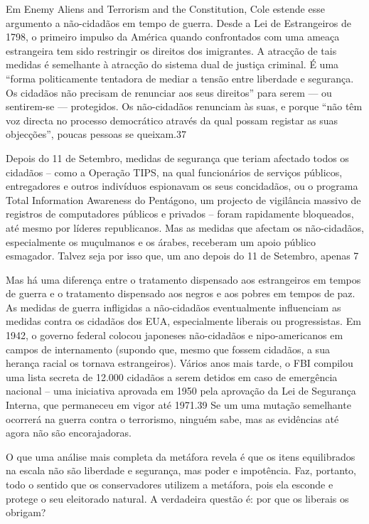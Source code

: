  \par 
Em Enemy Aliens and Terrorism and the Constitution, Cole estende esse argumento a não-cidadãos em tempo de guerra. Desde a Lei de Estrangeiros de 1798, o primeiro impulso da América quando confrontados com uma ameaça estrangeira tem sido restringir os direitos dos imigrantes. A atracção de tais medidas é semelhante à atracção do sistema dual de justiça criminal. É uma “forma politicamente tentadora de mediar a tensão entre liberdade e segurança. Os cidadãos não precisam de renunciar aos seus direitos” para serem — ou sentirem-se — protegidos. Os não-cidadãos renunciam às suas, e porque “não têm voz directa no processo democrático através da qual possam registar as suas objecções”, poucas pessoas se queixam.{\color{blue}37}
 \par 
Depois do {\color{blue}11} de Setembro, medidas de segurança que teriam afectado todos os cidadãos – como a Operação TIPS, na qual funcionários de serviços públicos, entregadores e outros indivíduos espionavam os seus concidadãos, ou o programa Total Information Awareness do Pentágono, um projecto de vigilância massivo de registros de computadores públicos e privados – foram rapidamente bloqueados, até mesmo por líderes republicanos. Mas as medidas que afectam os não-cidadãos, especialmente os muçulmanos e os árabes, receberam um apoio público esmagador. Talvez seja por isso que, um ano depois do {\color{blue}11} de Setembro, apenas 7%
 \par 
Mas há uma diferença entre o tratamento dispensado aos estrangeiros em tempos de guerra e o tratamento dispensado aos negros e aos pobres em tempos de paz. As medidas de guerra infligidas a não-cidadãos eventualmente influenciam as medidas contra os cidadãos dos EUA, especialmente liberais ou progressistas. Em 1942, o governo federal colocou japoneses não-cidadãos e nipo-americanos em campos de internamento (supondo que, mesmo que fossem cidadãos, a sua herança racial os tornava estrangeiros). Vários anos mais tarde, o FBI compilou uma lista secreta de {\color{blue}12}.{\color{blue}000} cidadãos a serem detidos em caso de emergência nacional – uma iniciativa aprovada em 1950 pela aprovação da Lei de Segurança Interna, que permaneceu em vigor até 1971.{\color{blue}39} Se um uma mutação semelhante ocorrerá na guerra contra o terrorismo, ninguém sabe, mas as evidências até agora não são encorajadoras.
 \par 
O que uma análise mais completa da metáfora revela é que os itens equilibrados na escala não são liberdade e segurança, mas poder e impotência. Faz, portanto, todo o sentido que os conservadores utilizem a metáfora, pois ela esconde e protege o seu eleitorado natural. A verdadeira questão é: por que os liberais os obrigam?
